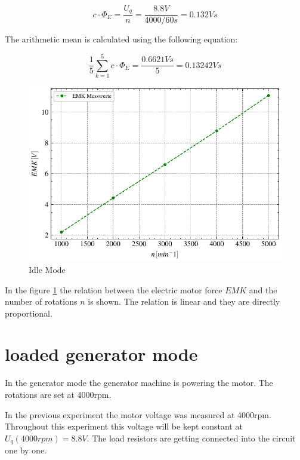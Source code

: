 \documentclass[conference]{IEEEtran}
\begin{document}
\begin{equation} \label{eq:machine_const}
    c \cdot \Phi_E = \frac{U_q}{n} = \frac{8.8\si{V}}{4000/60\si{s}} = 0.132\si{Vs}
\end{equation}

The arithmetic mean is calculated using the following equation:

\begin{equation}
    \frac{1}{5}\sum\limits_{k = 1}^{5} c \cdot \Phi_E = \frac{0.6621Vs}{5} = 0.13242Vs
\end{equation}

\begin{figure}[htbp]
    \centering
    \includegraphics[width=\columnwidth]{plots/4.1_Leerlaufversuch.pdf}
    \caption{Idle Mode}
    \label{fig:emk_n}
\end{figure}



In the figure \ref{fig:emk_n} the relation between the electric motor force
$EMK$ and the number of rotations $n$ is shown. The relation is linear and they
are directly proportional.


\section{loaded generator mode}

In the generator mode the generator machine is powering the motor. The
rotations are set at 4000rpm.

In the previous experiment the motor voltage was measured at 4000rpm.
Throughout this experiment this voltage will be kept constant at $U_q(4000rpm)
    = 8.8V$. The load resistors are getting connected into the circuit one by one.
\end{document}

